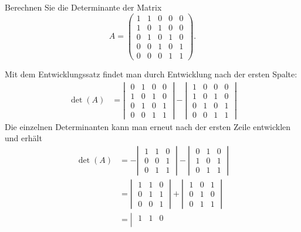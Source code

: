 Berechnen Sie die Determinante der Matrix
\[
A=
\begin{pmatrix}
1&1&0&0&0\\
1&0&1&0&0\\
0&1&0&1&0\\
0&0&1&0&1\\
0&0&0&1&1
\end{pmatrix}.
\]


\begin{loesung}
Mit dem Entwicklungssatz findet man durch Entwicklung nach der
ersten Spalte:
\begin{align*}
\det(A)
&=
\left|\;
\begin{matrix}
0&1&0&0\\
1&0&1&0\\
0&1&0&1\\
0&0&1&1
\end{matrix}
\;\right|
-
\left|\;
\begin{matrix}
1&0&0&0\\
1&0&1&0\\
0&1&0&1\\
0&0&1&1
\end{matrix}
\;\right|
\end{align*}
Die einzelnen Determinanten kann man erneut nach der ersten Zeile
entwicklen und erhält
\begin{align*}
\det(A)
&=
-\left|\;
\begin{matrix}
1&1&0\\
0&0&1\\
0&1&1
\end{matrix}
\;\right|
-
\left|\;
\begin{matrix}
0&1&0\\
1&0&1\\
0&1&1
\end{matrix}
\;\right|
\\
&=
\left|\;
\begin{matrix}
1&1&0\\
0&1&1\\
0&0&1
\end{matrix}
\;\right|
+
\left|\;
\begin{matrix}
1&0&1\\
0&1&0\\
0&1&1
\end{matrix}
\;\right|
\\
&=
\left|\;
\begin{matrix}
1&1&0\\

\end{matrix}
\end{align*}
\end{loesung}
